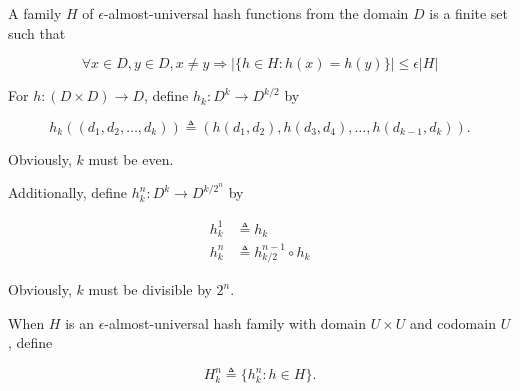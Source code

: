 \documentclass{letter}
\begin{document}
A family $H$ of $\epsilon$-almost-universal hash functions from the domain $D$ is a finite set such that

$$
\forall x \in D, y \in D, x \neq y \Rightarrow |\{h \in H : h(x) = h(y)\}| \leq \epsilon |H|
$$

For $h : (D \times D) \to D$, define $h_k : D^k \to D^{k/2}$ by 

$$
h_k((d_1,d_2,\dots,d_k)) \triangleq (h(d_1,d_2),h(d_3,d_4),\dots,h(d_{k-1},d_k)).
$$

Obviously, $k$ must be even.

Additionally, define $h^n_k : D^{k} \to D^{k/2^n}$ by

\begin{align*}
h^1_k &\triangleq h_k\\
h^n_k &\triangleq h^{n-1}_{k/2} \circ h_k
\end{align*}

Obviously, $k$ must be divisible by $2^n$.

When $H$ is an $\epsilon$-almost-universal hash family with domain $U\times U$ and codomain $U$,
define 

$$
H^n_k \triangleq \{h^n_k : h \in H\}.
$$
\end{document}
